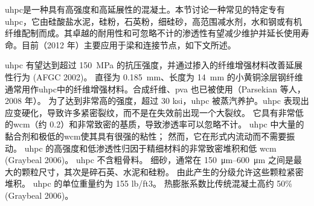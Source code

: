 \acrfull*{uhpc}是一种具有高强度和高延展性的混凝土。本节讨论一种常见的特定专有\acrlong*{uhpc}，它由硅酸盐水泥，硅粉，石英粉，细硅砂，高范围减水剂，水和钢或有机纤维配制而成。其卓越的耐用性和可忽略不计的渗透性有望减少维护并延长使用寿命。目前（2012 年）主要应用于梁和连接节点，如下文所述。

\acrlong*{uhpc} 有望达到超过 \qty{150}{MPa} 的抗压强度，并通过掺入的纤维增强材料改善延展性行为 (AFGC 2002)。 直径为 \qty{0.185}{mm}、长度为 \qty{14}{mm} 的小黄铜涂层钢纤维通常用作\acrlong*{uhpc}中的纤维增强材料。合成纤维、\acrfull*{pva} 也已被使用（Parsekian 等人，2008 年）。 为了达到非常高的强度，超过 30 ksi，\acrlong*{uhpc} 被蒸汽养护。\acrlong*{uhpc} 表现出应变硬化，导致许多紧密裂纹，而不是在失效前出现一个大裂纹。 它具有非常低的\acrlong*{wcm}（约 0.2）和非常致密的基质，导致渗透率可以忽略不计。 \acrlong*{uhpc} 中大量的黏合剂和极低的\acrlong*{wcm}使其具有很强的粘性； 然而，它在形式内流动而不需要振动。 \acrlong*{uhpc} 的高强度和低渗透性归因于精细材料的非常致密堆积和低 \acrlong*{wcm} (Graybeal 2006)。 \acrlong*{uhpc} 不含粗骨料。 细砂，通常在 \qtyrange{150}{600}{\micro m} 之间是最大的颗粒尺寸，其次是碎石英、水泥和硅粉。 由此产生的分级允许这些颗粒紧密堆积。 \acrlong*{uhpc} 的单位重量约为 155 lb/ft3。 热膨胀系数比传统混凝土高约 50\% (Graybeal 2006)。

